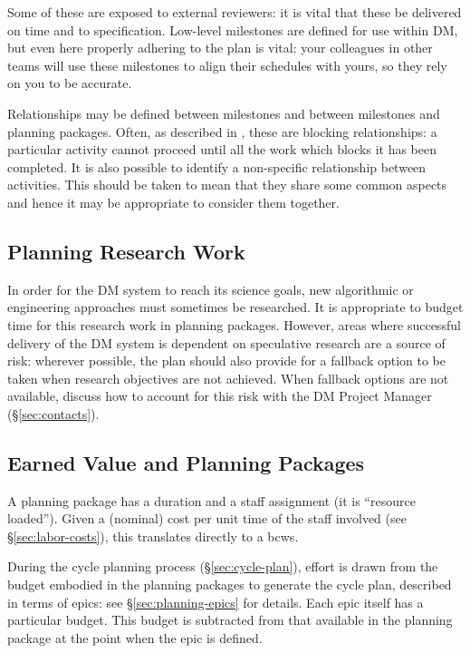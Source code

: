 Some of these are exposed to external reviewers: it is vital that these
be delivered on time and to specification. Low-level milestones are
defined for use within DM, but even here properly adhering to the plan
is vital: your colleagues in other teams will use these milestones to
align their schedules with yours, so they rely on you to be accurate.

Relationships may be defined between milestones and between milestones
and planning packages. Often, as described in , these are blocking
relationships: a particular activity cannot proceed until all the work
which blocks it has been completed. It is also possible to identify a
non-specific relationship between activities. This should be taken to
mean that they share some common aspects and hence it may be appropriate
to consider them together.

\subsection{Planning Research Work}
\label{sec:long-term-research}

In order for the DM system to reach its science goals, new algorithmic or engineering approaches must sometimes be researched.
It is appropriate to budget time for this research work in planning packages.
However, areas where successful delivery of the DM system is dependent on speculative research are a source of \gls{risk}: wherever possible, the plan should also provide for a fallback option to be taken when research objectives are not achieved.
When fallback options are not available, discuss how to account for this \gls{risk} with the DM Project Manager (\S\ref{sec:contacts}).

\subsection{Earned Value and Planning Packages}
\label{sec:long-term-value}

A planning package has a duration and a staff assignment (it is ``resource loaded'').
Given a (nominal) cost per unit time of the staff involved (see \S\ref{sec:labor-costs}), this translates directly to a \gls{bcws}.

During the \gls{cycle} planning process (\S\ref{sec:cycle-plan}), effort is drawn from the budget embodied in the planning packages to generate the \gls{cycle} plan, described in terms of \glspl{epic}: see \S\ref{sec:planning-epics} for details.
Each \gls{epic} itself has a particular budget.
This budget is subtracted from that available in the planning package at the point when the \gls{epic} is defined.

